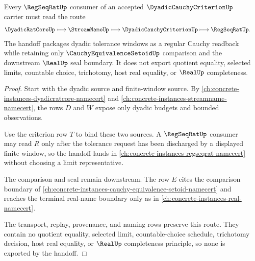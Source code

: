 \begin{theorem}
\label{thm:dyadic-cauchy-criterion-regseqrat-handoff}
Every $\RegSeqRatUp$ consumer of an accepted $\DyadicCauchyCriterionUp$ carrier must read the route
$$
\DyadicRatCoreUp \longmapsto \StreamNameUp \longmapsto \DyadicCauchyCriterionUp \longmapsto \RegSeqRatUp .
$$
The handoff packages dyadic tolerance windows as a regular Cauchy readback while retaining only $\CauchyEquivalenceSetoidUp$ comparison and the downstream $\RealUp$ seal boundary. It does not export quotient equality, selected limits, countable choice, trichotomy, host real equality, or $\RealUp$ completeness.
\end{theorem}
\begin{proof}
Start with the dyadic source and finite-window source. By \autoref{ch:concrete-instances-dyadicratcore-namecert} and \autoref{ch:concrete-instances-streamname-namecert}, the rows $D$ and $W$ expose only dyadic budgets and bounded observations.

Use the criterion row $T$ to bind these two sources. A $\RegSeqRatUp$ consumer may read $R$ only after the tolerance request has been discharged by a displayed finite window, so the handoff lands in \autoref{ch:concrete-instances-regseqrat-namecert} without choosing a limit representative.

The comparison and seal remain downstream. The row $E$ cites the comparison boundary of \autoref{ch:concrete-instances-cauchy-equivalence-setoid-namecert} and reaches the terminal real-name boundary only as in \autoref{ch:concrete-instances-real-namecert}.

The transport, replay, provenance, and naming rows preserve this route. They contain no quotient equality, selected limit, countable-choice schedule, trichotomy decision, host real equality, or $\RealUp$ completeness principle, so none is exported by the handoff.
\end{proof}


